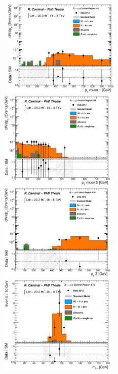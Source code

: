 \begin{figure}[!ht]
  \begin{center}
    \mbox{
      \includegraphics[width=0.495\textwidth]{Appendix_FluctuationM6/Figures/plot_Stop_A10_CRzmm_m_pt_fitted.eps}
      \includegraphics[width=0.495\textwidth]{Appendix_FluctuationM6/Figures/plot_Stop_A10_CRzmm_m2_pt_fitted.eps}
    }
    \mbox{
      \includegraphics[width=0.495\textwidth]{Appendix_FluctuationM6/Figures/plot_Stop_A10_CRzmm_m_Zpt_fitted.eps}
      \includegraphics[width=0.495\textwidth]{Appendix_FluctuationM6/Figures/plot_Stop_A10_CRzmm_m_M_fitted.eps}
}
\end{center}
\end{figure}
